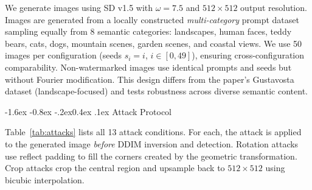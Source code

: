 \documentclass[10pt,twocolumn]{article}
\makeatletter
\renewcommand\subsection{\@startsection{subsection}{2}{\z@}%
  {-1.6ex \@plus -0.8ex \@minus -.2ex}{0.4ex \@plus .1ex}%
  {\normalfont\normalsize\itshape}}
\makeatother
\begin{document}
We generate images using SD v1.5 with $\omega{=}7.5$ and $512{\times}512$
output resolution.
Images are generated from a locally constructed \emph{multi-category}
prompt dataset sampling equally from 8 semantic categories: landscapes,
human faces, teddy bears, cats, dogs, mountain scenes, garden scenes,
and coastal views.
We use 50 images per configuration (seeds $s_i = i$, $i \in [0,49]$),
ensuring cross-configuration comparability.
Non-watermarked images use identical prompts and seeds but without
Fourier modification.
This design differs from the paper's Gustavosta dataset (landscape-focused)
and tests robustness across diverse semantic content.

\subsection{Attack Protocol}

Table~\ref{tab:attacks} lists all 13 attack conditions.
For each, the attack is applied to the generated image
\emph{before} DDIM inversion and detection.
Rotation attacks use reflect padding to fill the corners created by
the geometric transformation.
Crop attacks crop the central region and upsample back to $512{\times}512$
using bicubic interpolation.
\end{document}
